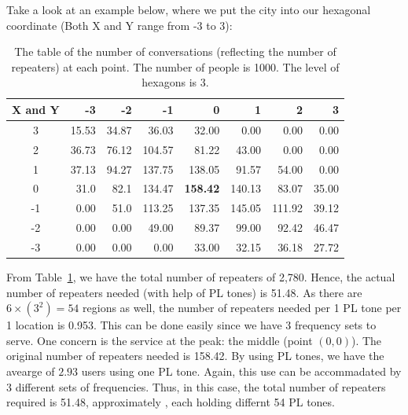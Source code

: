 \documentclass{icmmcm}
\begin{document}
Take a look at an example below, where we put the city into our hexagonal coordinate (Both X and Y range from -3 to 3):
\begin{table}[htbp]
  \begin{center}
    \begin{tabular}{@{}c|rrrrrrr@{}} \toprule
X and Y  	&-3 	&-2 		&-1		&0		&1		&2		&3\\ \midrule   
3&15.53	&34.87	&36.03	&32.00	&0.00	&0.00	&0.00    \\ 
2&36.73	&76.12	&104.57	&81.22	&43.00	&0.00	&0.00	\\
1&37.13	&94.27	&137.75	&138.05	&91.57	&54.00	&0.00	\\
0&31.0	&82.1	&134.47	&\textbf{158.42}	&140.13	&83.07	&35.00	\\
-1&0.00	&51.0	&113.25	&137.35	&145.05	&111.92	&39.12	\\
-2&0.00	&0.00	&49.00	&89.37	&99.00	&92.42	&46.47	\\
-3&0.00	&0.00	&0.00	&33.00	&32.15	&36.18	&27.72	\\
 \bottomrule	
    \end{tabular}
  \end{center}
  \caption[A Distribution of Repeaters for a Uniform Distribution of People]{The table of the number of conversations (reflecting the number of repeaters) at each point. The number of people is 1000. The level of hexagons is 3.}
  \label{tab:uniform}
\end{table}

From Table~\ref{tab:uniform}, we have the total number of repeaters of 2,780. Hence, the actual number of repeaters needed (with help of PL tones) is 51.48. As there are $6\times(3^2)=54$ regions as well, the number of repeaters needed per 1 PL tone per 1 location is 0.953. This can be done easily since we have 3 frequency sets to serve. One concern is the service at the peak: the middle (point $(0,0)$). The original number of repeaters needed is 158.42. By using PL tones, we have the avearge of $2.93$ users using one PL tone. Again, this use can be accommadated by 3 different sets of frequencies. Thus, in this case, the total number of repeaters required is 51.48, approximately  , each holding differnt 54 PL tones.

\end{document}
